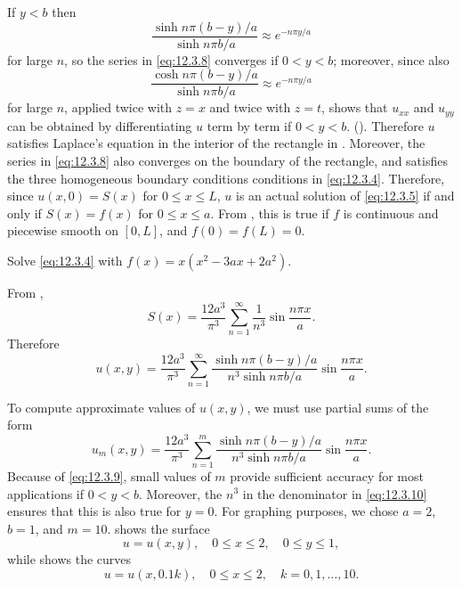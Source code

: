 If $y<b$ then
\begin{equation} \label{eq:12.3.9}
\frac{\sinh n\pi(b-y)/a}{\sinh n\pi b/a}\approx e^{-n\pi y/a}
\end{equation}
for large $n$,
so the series in \eqref{eq:12.3.8} converges if $0< y < b$;
 moreover, since also
\[
\frac{\cosh n\pi(b-y)/a}{\sinh n\pi b/a}\approx e^{-n\pi y/a}
\]
for large $n$, 
 applied twice with
 $z=x$ and  twice with  $z=t$, shows that   $u_{xx}$  and $u_{yy}$
can be obtained by differentiating $u$ term by term if $0<y<b$.
 (). Therefore $u$
satisfies Laplace's equation in the interior of the rectangle
in .
Moreover, the series in \eqref{eq:12.3.8}
also converges on the boundary of the rectangle, and satisfies
the three homogeneous boundary conditions
conditions in \eqref{eq:12.3.4}.
 Therefore, since $u(x,0)=S(x)$ for $0\le x\le
L$, $u$ is an actual solution of \eqref{eq:12.3.5} if and only if
$S(x)=f(x)$ for $0\le x\le a$.
From , this is true if $f$
is continuous and piecewise smooth on $[0,L]$,
and $f(0)=f(L)=0$.

\begin{example}\label{example:12.3.2}
Solve \eqref{eq:12.3.4} with $f(x)=x(x^2-3ax+2a^2)$.
\end{example}

\begin{solution}
From ,
\[
S(x)=\frac{12a^3}{\pi^3}\sum_{n=1}^\infty\frac{1}{n^3}\sin\frac{n\pi
x}{a}.
\]
Therefore
\begin{equation} \label{eq:12.3.10}
u(x,y)=\frac{12a^3}{\pi^3}\sum_{n=1}^\infty\frac{\sinh n\pi(b-y)/a}{n^3\sinh n\pi b/a}
\sin\frac{n\pi x}{a}.
\end{equation}

To compute approximate values of $u(x,y)$, we must use partial sums of
the form
\[
u_m(x,y)=\frac{12a^3}{\pi^3}\sum_{n=1}^m\frac{\sinh n\pi(b-y)/a}{n^3\sinh n\pi b/a}
\sin\frac{n\pi x}{a}.
\]
Because of \eqref{eq:12.3.9}, small values of $m$
provide  sufficient accuracy for most applications if $0<y<b$.
Moreover, the
$n^3$ in the denominator in \eqref{eq:12.3.10} ensures that this is also
true for $y=0$.
 For graphing purposes, we chose $a=2$, $b=1$,
and $m=10$.
  shows the surface
\[
u=u(x,y),\quad 0\le x\le 2,\quad 0\le y\le1,
\]
while   shows the curves
\[
u=u(x,0.1k),\quad 0\le x\le2,\quad k=0,1,\dots,10.
\]
\end{solution}

